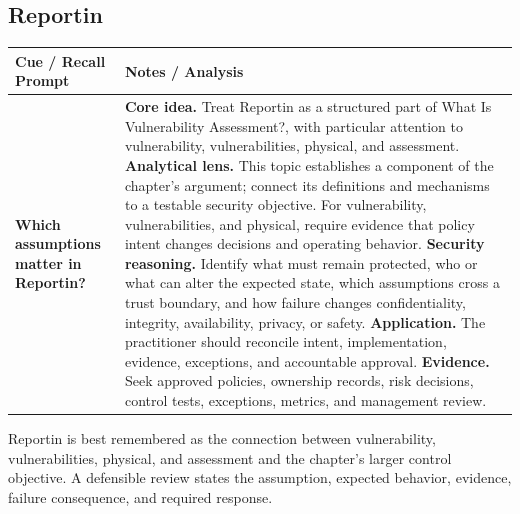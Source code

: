 \documentclass[11pt]{article}
\newcommand{\CornellHeader}{%
\rowcolor{Navy}\color{white}\bfseries Cue / Recall Prompt & \color{white}\bfseries Notes / Analysis\\\hline}
\newcommand{\CornellRow}[2]{%
\cellcolor{CueGray}\RaggedRight\textbf{#1} & \RaggedRight #2\\\hline}
\begin{document}
\subsection*{Reportin}
\begin{longtable}{>{\RaggedRight\arraybackslash}p{}|>{\RaggedRight\arraybackslash}p{}}
\CornellHeader
\CornellRow{Which assumptions matter in Reportin?}{\textbf{Core idea.} Treat Reportin as a structured part of What Is Vulnerability Assessment?, with particular attention to vulnerability, vulnerabilities, physical, and assessment. \textbf{Analytical lens.} This topic establishes a component of the chapter's argument; connect its definitions and mechanisms to a testable security objective. For vulnerability, vulnerabilities, and physical, require evidence that policy intent changes decisions and operating behavior. \textbf{Security reasoning.} Identify what must remain protected, who or what can alter the expected state, which assumptions cross a trust boundary, and how failure changes confidentiality, integrity, availability, privacy, or safety. \textbf{Application.} The practitioner should reconcile intent, implementation, evidence, exceptions, and accountable approval. \textbf{Evidence.} Seek approved policies, ownership records, risk decisions, control tests, exceptions, metrics, and management review.}
\end{longtable}
\begin{topicsummary}
Reportin is best remembered as the connection between vulnerability, vulnerabilities, physical, and assessment and the chapter's larger control objective. A defensible review states the assumption, expected behavior, evidence, failure consequence, and required response.
\end{topicsummary}
\end{document}
